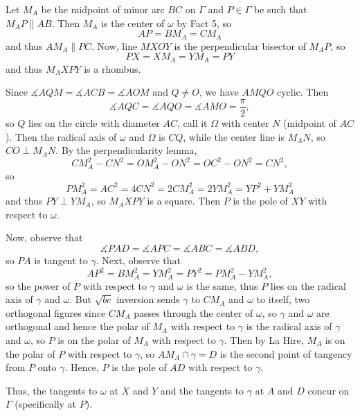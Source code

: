 Let $M_A$ be the midpoint of minor arc $BC$ on $\Gamma$ and $P\in\Gamma$ be such that $M_AP\parallel AB$. Then $M_A$ is the center of $\omega$ by Fact 5, so \[AP=BM_A=CM_A\] and thus $AM_A\parallel PC$. Now, line $MXOY$ is the perpendicular bisector of $M_AP$, so \[PX=XM_A=YM_A=PY\] and thus $M_AXPY$ is a rhombus.

Since $\measuredangle{AQM}=\measuredangle{ACB}=\measuredangle{AOM}$ and $Q\neq O$, we have $AMQO$ cyclic. Then \[\measuredangle{AQC}=\measuredangle{AQO}=\measuredangle{AMO}=\frac{\pi}{2},\] so $Q$ lies on the circle with diameter $AC$, call it $\Omega$ with center $N$ (midpoint of $AC$). Then the radical axis of $\omega$ and $\Omega$ is $CQ$, while the center line is $M_AN$, so $CO\perp M_AN$. By the perpendicularity lemma, \[CM_A^2-CN^2=OM_A^2-ON^2=OC^2-ON^2=CN^2,\] so \[PM_A^2=AC^2=4CN^2=2CM_A^2=2YM_A^2=YP^2+YM_A^2\] and thus $PY\perp YM_A$, so $M_AXPY$ is a square. Then $P$ is the pole of $XY$ with respect to $\omega$.

Now, observe that \[\measuredangle{PAD}=\measuredangle{APC}=\measuredangle{ABC}=\measuredangle{ABD},\] so $PA$ is tangent to $\gamma$. Next, observe that \[AP^2=BM_A^2=YM_A^2=PY^2=PM_A^2-YM_A^2,\] so the power of $P$ with respect to $\gamma$ and $\omega$ is the same, thus $P$ lies on the radical axis of $\gamma$ and $\omega$. But $\sqrt{bc}$ inversion sends $\gamma$ to $CM_A$ and $\omega$ to itself, two orthogonal figures since $CM_A$ passes through the center of $\omega$, so $\gamma$ and $\omega$ are orthogonal and hence the polar of $M_A$ with respect to $\gamma$ is the radical axis of $\gamma$ and $\omega$, so $P$ is on the polar of $M_A$ with respect to $\gamma$. Then by La Hire, $M_A$ is on the polar of $P$ with respect to $\gamma$, so $AM_A\cap\gamma=D$ is the second point of tangency from $P$ onto $\gamma$. Hence, $P$ is the pole of $AD$ with respect to $\gamma$.

Thus, the tangents to $\omega$ at $X$ and $Y$ and the tangents to $\gamma$ at $A$ and $D$ concur on $\Gamma$ (specifically at $P$).